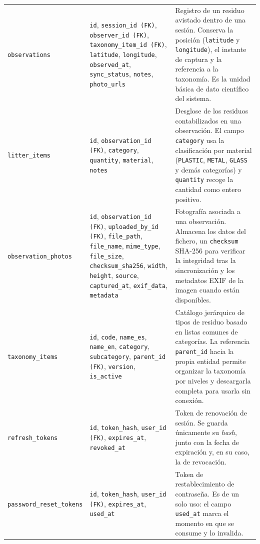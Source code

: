 \begin{longtable}{@{}>{\raggedright\arraybackslash}p{3.8cm}
                  >{\raggedright\arraybackslash}p{5.3cm}
                  >{\raggedright\arraybackslash}p{6.0cm}@{}}
  \texttt{observations} &
    \texttt{id}, \texttt{session\_id (FK)}, \texttt{observer\_id (FK)},
    \texttt{taxonomy\_item\_id (FK)}, \texttt{latitude}, \texttt{longitude},
    \texttt{observed\_at}, \texttt{sync\_status}, \texttt{notes},
    \texttt{photo\_urls} &
    Registro de un residuo avistado dentro de una sesión. Conserva la posición
    (\texttt{latitude} y \texttt{longitude}), el instante de captura y la referencia
    a la taxonomía. Es la unidad básica de dato científico del sistema. \\[4pt]

  \texttt{litter\_items} &
    \texttt{id}, \texttt{observation\_id (FK)}, \texttt{category}, \texttt{quantity},
    \texttt{material}, \texttt{notes} &
    Desglose de los residuos contabilizados en una observación. El campo
    \texttt{category} usa la clasificación por material (\texttt{PLASTIC},
    \texttt{METAL}, \texttt{GLASS} y demás categorías) y \texttt{quantity} recoge la
    cantidad como entero positivo. \\[4pt]

  \texttt{observation\_photos} &
    \texttt{id}, \texttt{observation\_id (FK)}, \texttt{uploaded\_by\_id (FK)},
    \texttt{file\_path}, \texttt{file\_name}, \texttt{mime\_type}, \texttt{file\_size},
    \texttt{checksum\_sha256}, \texttt{width}, \texttt{height}, \texttt{source},
    \texttt{captured\_at}, \texttt{exif\_data}, \texttt{metadata} &
    Fotografía asociada a una observación. Almacena los datos del fichero, un
    \texttt{checksum} SHA-256 para verificar la integridad tras la sincronización y
    los metadatos EXIF de la imagen cuando están disponibles. \\[4pt]

  \texttt{taxonomy\_items} &
    \texttt{id}, \texttt{code}, \texttt{name\_es}, \texttt{name\_en},
    \texttt{category}, \texttt{subcategory}, \texttt{parent\_id (FK)},
    \texttt{version}, \texttt{is\_active} &
    Catálogo jerárquico de tipos de residuo basado en listas comunes de categorías.
    La referencia \texttt{parent\_id} hacia la propia entidad permite organizar la
    taxonomía por niveles y descargarla completa para usarla sin conexión. \\[4pt]

  \texttt{refresh\_tokens} &
    \texttt{id}, \texttt{token\_hash}, \texttt{user\_id (FK)}, \texttt{expires\_at},
    \texttt{revoked\_at} &
    Token de renovación de sesión. Se guarda únicamente su \textit{hash}, junto con la
    fecha de expiración y, en su caso, la de revocación. \\[4pt]

  \texttt{password\_reset\_}\allowbreak{}\texttt{tokens} &
    \texttt{id}, \texttt{token\_hash}, \texttt{user\_id (FK)}, \texttt{expires\_at},
    \texttt{used\_at} &
    Token de restablecimiento de contraseña. Es de un solo uso: el campo
    \texttt{used\_at} marca el momento en que se consume y lo invalida. \\

\end{longtable}
\endgroup

